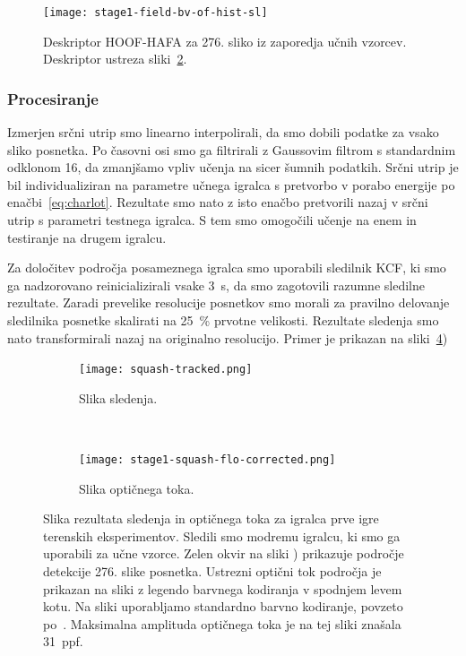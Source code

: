 \begin{figure}[!htb]
	\centering
	\texttt{[image: stage1-field-bv-of-hist-sl]}
	\caption[Deskriptor HOOF-HAFA za 276. sliko sliko iz zaporedja učnih vzorcev]{Deskriptor HOOF-HAFA za 276. sliko iz zaporedja učnih vzorcev. Deskriptor ustreza sliki~\ref{fig:sledenje-squash}.}
	\label{fig:hoof-hafa}
\end{figure}

\subsubsection{Procesiranje}
Izmerjen srčni utrip smo linearno interpolirali, da smo dobili podatke za vsako sliko posnetka. Po časovni osi smo ga filtrirali z Gaussovim filtrom s standardnim odklonom \num{16}, da zmanjšamo vpliv učenja na sicer šumnih podatkih. Srčni utrip je bil individualiziran na parametre učnega igralca s pretvorbo v porabo energije po enačbi~\eqref{eq:charlot}. Rezultate smo nato z isto enačbo pretvorili nazaj v srčni utrip s parametri testnega igralca. S tem smo omogočili učenje na enem in testiranje na drugem igralcu. 

Za določitev področja posameznega igralca smo uporabili sledilnik KCF, ki smo ga nadzorovano reinicializirali vsake \SI{3}{\s}, da smo zagotovili razumne sledilne rezultate. Zaradi prevelike resolucije posnetkov smo morali za pravilno delovanje sledilnika posnetke skalirati na \SI{25}{\%} prvotne velikosti. Rezultate sledenja smo nato transformirali nazaj na originalno resolucijo. Primer je prikazan na sliki~\ref{fig:squash})

\begin{figure}[!htb]
	\centering
	\begin{subfigure}[t]{0.45\columnwidth}
		\centering
		\texttt{[image: squash-tracked.png]}
		\caption{Slika sledenja.}
	    \label{fig:sledenje-squash}
	\end{subfigure}
	~
	\begin{subfigure}[t]{0.45\columnwidth}
		\centering
		\texttt{[image: stage1-squash-flo-corrected.png]}
		\caption{Slika optičnega toka.}
		\label{fig:of-squash}
	\end{subfigure}
	\caption[Slika sledenja in optičnega toka za igralca terenskih eksperimentov]{Slika rezultata sledenja in optičnega toka za igralca prve igre terenskih eksperimentov. Sledili smo modremu igralcu, ki smo ga uporabili za učne vzorce. Zelen okvir na sliki ) prikazuje področje detekcije 276. slike posnetka. Ustrezni optični tok področja je prikazan na sliki  z legendo barvnega kodiranja v spodnjem levem kotu. Na sliki uporabljamo standardno barvno kodiranje, povzeto po~\cite{baker2011database}. Maksimalna amplituda optičnega toka je na tej sliki znašala \SI{31}{ppf}. }
	\label{fig:squash}
\end{figure}


